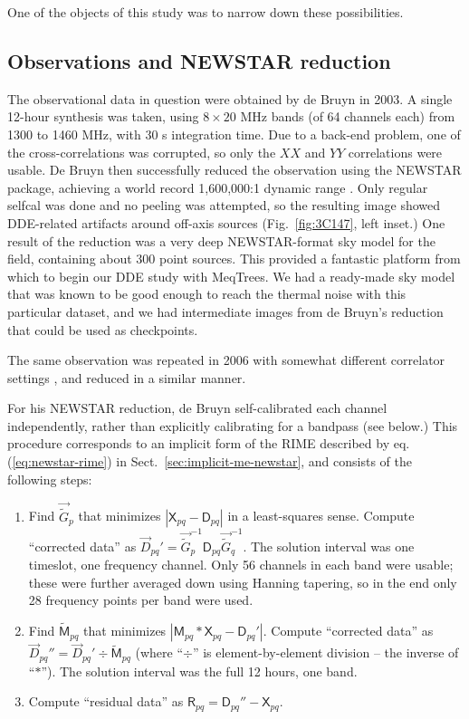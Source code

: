 \documentclass[]{aa}
\newcommand{\jones}[2]{\vec {#1}_{#2}}
\newcommand{\jonesinv}[2]{\vec {#1}^{-1}_{#2}}
\newcommand{\coh}[2]{\mathsf{{#1}}_{{#2}}}
\begin{document}
One of the objects of this study was to narrow down these possibilities.

\subsection{Observations and NEWSTAR reduction}

The observational data in question were obtained by de Bruyn in 2003. A single 12-hour synthesis was taken, using $8\times20$ MHz bands (of 64 channels each) from 1300 to 1460 MHz, with 30 s integration time. Due to a back-end problem, one of the cross-correlations was corrupted, so only the $XX$ and $YY$ correlations were usable. De Bruyn then successfully reduced the observation using the NEWSTAR package, achieving a world record 1,600,000:1 dynamic range \citep{deBruyn:3C147}. Only regular selfcal was done and no peeling was attempted, so the resulting image showed DDE-related artifacts around off-axis sources (Fig.~\ref{fig:3C147}, left inset.) One result of the reduction was a very deep NEWSTAR-format sky model for the field, containing about 300 point sources. This provided a fantastic platform from which to begin our DDE study with MeqTrees. We had a ready-made sky model that was known to be good enough to reach the thermal noise with this particular dataset, and we had intermediate images from de Bruyn's reduction that could be used as checkpoints.

The same observation was repeated in 2006 with somewhat different correlator settings \citep[for details, see]{deBruyn:3C147}, and reduced in a similar manner.

For his NEWSTAR reduction, de Bruyn self-calibrated each channel independently, rather than explicitly calibrating for a bandpass (see below.) This procedure corresponds to an implicit form of the RIME described by eq. (\ref{eq:newstar-rime}) in Sect.~\ref{sec:implicit-me-newstar}, and consists of the following steps:

\begin{enumerate}
\item Find $\jones{\tilde{G}}{p}$ that minimizes $|\coh{X}{pq} - \coh{D}{pq}|$ in a least-squares sense. Compute ``corrected data'' as $\jones{D}{pq}' = \jonesinv{\tilde{G}}{p} \coh{D}{pq} \jonesinv{\tilde{G}}{q}.$ The solution interval was one timeslot, one frequency channel. Only 56 channels in each band were usable; these were further averaged down using Hanning tapering, so in the end only 28 frequency points per band were used.

\item Find $\coh{\tilde{M}}{pq}$ that minimizes $|\coh{M}{pq} \ast \coh{X}{pq} - \coh{D}{pq}'|$.
Compute ``corrected data'' as $\jones{D}{pq}'' = \jones{D}{pq}' \div \coh{\tilde{M}}{pq}$ (where ``$\div$'' is element-by-element division -- the inverse of ``$\ast$''). The solution interval was the full 12 hours, one band.

\item Compute ``residual data'' as $\coh{R}{pq} = \coh{D}{pq}'' - \coh{X}{pq}$. 
\end{enumerate}
\end{document}
